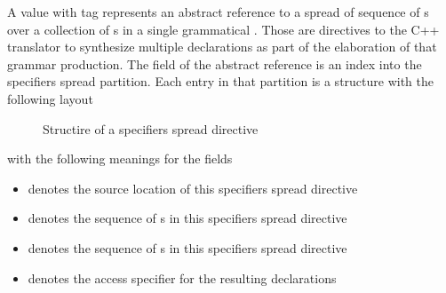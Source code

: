 A  value with tag  represents an abstract reference to a spread of sequence of s 
over a collection of s in a single grammatical . 
Those are directives to the C++ translator to synthesize multiple declarations as part of the elaboration of that grammar production.
The  field of the abstract reference is an index into the specifiers spread partition.
Each entry in that partition is a structure with the following layout
%
\begin{figure}[H]
    \centering
    \caption{Structire of a specifiers spread directive}
    \label{fig:ifc:DirSort:SpecifiersSpread}
\end{figure}
%
with the following meanings for the fields
\begin{itemize}
    \item {} denotes the source location of this specifiers spread directive
    \item {} denotes the sequence of s in this specifiers spread directive
    \item {} denotes the sequence of s in this specifiers spread directive
    \item {} denotes the access specifier for the resulting declarations
\end{itemize}




\subsection{}
\label{sec:ifc:DirSort:Tuple}

